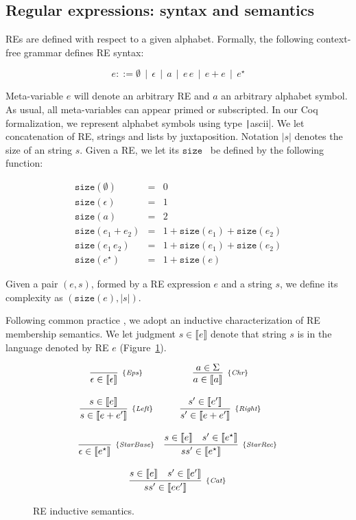 \documentclass[review]{elsarticle}
\newcommand{\Eps}{\textit{Eps}}
\newcommand{\Chr}{\textit{Chr}}
\newcommand{\Catt}{\textit{Cat}}
\newcommand{\Left}{\textit{Left}}
\newcommand{\Right}{\textit{Right}}
\newcommand{\StarBase}{\textit{StarBase}}
\newcommand{\StarRec}{\textit{StarRec}}
\newcommand{\sembrackets}[1]{\ensuremath{\llbracket #1 \rrbracket}}
\newcommand{\size}{\ensuremath{\texttt{size}}}
\newcommand{\coq}[1]{\texttt|#1|}
\theoremstyle{definition}
\begin{document}
\subsection{Regular expressions: syntax and semantics}\label{subsection:resyntaxsemantics}


REs are defined with respect to a given alphabet. Formally, the following context-free
grammar defines RE syntax:

\[
e ::= \emptyset\,\mid\,\epsilon\,\mid\,a\,\mid\,e\,e\,\mid\,e+e\,\mid\,e^{\star}
\]

Meta-variable $e$ will denote an arbitrary RE and $a$ an
arbitrary alphabet symbol. As usual, all meta-variables can appear primed or subscripted.
In our Coq formalization, we represent alphabet symbols using type \coq{ascii}. We let concatenation
of RE, strings and lists by juxtaposition. Notation $|s|$
denotes the size of an string $s$. Given a RE, we let its \size~ be defined by the following 
function:


\[
\begin{array}{lcl}
   \size(\emptyset) & = & 0 \\
   \size(\epsilon)  & = & 1 \\
   \size(a)         & = & 2 \\
   \size(e_1 + e_2) & = & 1 + \size(e_1) + \size(e_2)\\
   \size(e_1\,e_2)  & = & 1 + \size(e_1) + \size(e_2)\\
   \size(e ^\star)  & = & 1 + \size(e)
\end{array}
\]

Given a pair $(e,s)$, formed by a RE expression $e$ and a string $s$, we define its complexity as
$(\size(e),|s|)$. 

Following common practice \cite{Lopes2016,Ribeiro2017,Rathnayake2011}, we adopt an inductive
characterization of RE membership semantics. We let judgment $s \in \sembrackets{e}$ denote
that string $s$ is in the language denoted by RE $e$ (Figure~\ref{figure:resemantics}).

\begin{figure}[h]
	\[
	\begin{array}{cc}
	\infer[_{\{\Eps\}}]
	{\epsilon \in \sembrackets{\epsilon}}{} &
	\infer[_{\{\Chr\}}]
	{a \in \sembrackets{a}}{a \in \Sigma} \\ \\
	\infer[_{\{\Left\}}]
	{s \in \sembrackets{e + e'}}{s \in \sembrackets{e}} &
	\infer[_{\{\Right\}}]
	{s' \in \sembrackets{e + e'}}{s' \in \sembrackets{e'}} \\ \\
	\infer[_{\{\StarBase\}}]
	{\epsilon \in \sembrackets{e^\star}}{} &
	\infer[_{\{\StarRec\}}]
	{ss' \in \sembrackets{e^\star}}
	{s \in \sembrackets{e} & s' \in \sembrackets{e^\star}} \\ \\
	\multicolumn{2}{c}{
		\infer[_{\{\Catt\}}]
		{ss' \in \sembrackets{ee'}}
		{s \in \sembrackets{e} & s' \in \sembrackets{e'}}
	} \\
	\end{array}
	\]
	\centering
	\caption{RE inductive semantics.}
	\label{figure:resemantics}
\end{figure}
\end{document}
